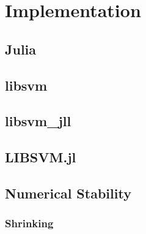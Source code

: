 \section{Implementation}

\subsection{Julia}

\textcite{arquemartinezDissenyImplementacioEstudi2021}

\subsection{libsvm}

\textcite{CC01a}

\subsection{libsvm\_jll}

\textcite{LibsvmJllJl2022}

\subsection{LIBSVM.jl}

\textcite{LIBSVMJl2023}

\subsection{Numerical Stability}

\subsubsection{Shrinking}
